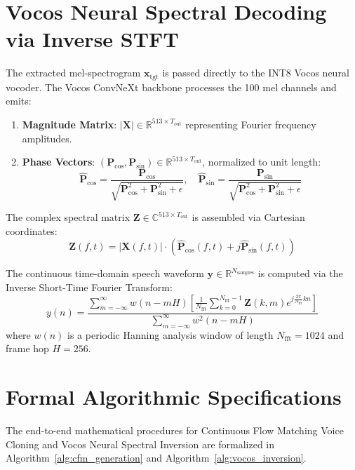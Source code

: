 \section{Vocos Neural Spectral Decoding via Inverse STFT}
The extracted mel-spectrogram $\mathbf{x}_{\text{tgt}}$ is passed directly to the INT8 Vocos neural vocoder. The Vocos ConvNeXt backbone processes the 100 mel channels and emits:
\begin{enumerate}
    \item \textbf{Magnitude Matrix}: $|\mathbf{X}| \in \mathbb{R}^{513 \times T_{\text{out}}}$ representing Fourier frequency amplitudes.
    \item \textbf{Phase Vectors}: $(\mathbf{P}_{\text{cos}}, \mathbf{P}_{\text{sin}}) \in \mathbb{R}^{513 \times T_{\text{out}}}$, normalized to unit length:
    \begin{equation}
        \hat{\mathbf{P}}_{\text{cos}} = \frac{\mathbf{P}_{\text{cos}}}{\sqrt{\mathbf{P}_{\text{cos}}^2 + \mathbf{P}_{\text{sin}}^2 + \epsilon}}, \quad \hat{\mathbf{P}}_{\text{sin}} = \frac{\mathbf{P}_{\text{sin}}}{\sqrt{\mathbf{P}_{\text{cos}}^2 + \mathbf{P}_{\text{sin}}^2 + \epsilon}}
        \label{eq:phase_normalization}
    \end{equation}
\end{enumerate}

The complex spectral matrix $\mathbf{Z} \in \mathbb{C}^{513 \times T_{\text{out}}}$ is assembled via Cartesian coordinates:
\begin{equation}
    \mathbf{Z}(f, t) = |\mathbf{X}(f, t)| \cdot \left( \hat{\mathbf{P}}_{\text{cos}}(f, t) + j \hat{\mathbf{P}}_{\text{sin}}(f, t) \right)
    \label{eq:complex_assembly}
\end{equation}

The continuous time-domain speech waveform $\mathbf{y} \in \mathbb{R}^{N_{\text{samples}}}$ is computed via the Inverse Short-Time Fourier Transform:
\begin{equation}
    y(n) = \frac{\sum_{m=-\infty}^\infty w(n - mH) \left[ \frac{1}{N_{\text{fft}}} \sum_{k=0}^{N_{\text{fft}}-1} \mathbf{Z}(k, m) e^{j \frac{2\pi}{N_{\text{fft}}} kn} \right]}{\sum_{m=-\infty}^\infty w^2(n - mH)}
    \label{eq:istft_formal}
\end{equation}
where $w(n)$ is a periodic Hanning analysis window of length $N_{\text{fft}} = 1024$ and frame hop $H = 256$.

\section{Formal Algorithmic Specifications}
The end-to-end mathematical procedures for Continuous Flow Matching Voice Cloning and Vocos Neural Spectral Inversion are formalized in Algorithm~\ref{alg:cfm_generation} and Algorithm~\ref{alg:vocos_inversion}.

